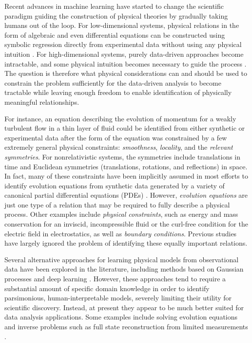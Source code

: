 \documentclass[
 reprint,
 amsmath,amssymb,
 aps,
]{revtex4-2}
\begin{document}
Recent advances in machine learning have started to change the scientific paradigm guiding the construction of physical theories by gradually taking humans out of the loop. For low-dimensional systems, physical relations in the form of algebraic and even differential equations can be constructed using symbolic regression directly from experimental data without using any physical intuition \cite{crutchfield1987,bongard2007,schmidt2009}. For high-dimensional systems, purely data-driven approaches become intractable, and some physical intuition becomes necessary to guide the process \cite{karpatne2017}. The question is therefore what physical considerations can and should be used to constrain the problem sufficiently for the data-driven analysis to become tractable while leaving enough freedom to enable identification of physically meaningful relationships.

For instance, an equation describing the evolution of momentum for a weakly turbulent flow in a thin layer of fluid could be identified from either synthetic  \cite{reinbold2020} or experimental data \cite{reinbold2021} after the form of the equation was constrained by a few extremely general physical constraints: {\it smoothness}, {\it locality}, and the {\it relevant symmetries}. 
For nonrelativistic systems, the symmetries include translations in time and Euclidean symmetries (translations, rotations, and reflections) in space. In fact, many of these constraints have been implicitly assumed in most efforts to identify evolution equations from synthetic data generated by a variety of canonical partial differential equations (PDEs) \cite{bar1999,xu2008,rudy2017,schaeffer2017,raissi2018}. However, {\it evolution equations} are just one type of a relation that may be required to fully describe a physical process. Other examples include {\it physical constraints}, such as energy and mass conservation for an inviscid, incompressible fluid or the curl-free condition for the electric field in electrostatics, as well as {\it boundary conditions}. Previous studies have largely ignored the problem of identifying these equally important relations.

Several alternative approaches for learning physical models from observational data have been explored in the literature, including methods based on Gaussian processes \cite{raissi2018} and deep learning  \cite{raissi2019}. However, these approaches tend to require a substantial amount of specific domain knowledge in order to identify parsimonious, human-interpretable models, severely limiting their utility for scientific discovery. Instead, at present they appear to be much better suited for data analysis applications. Some examples include solving evolution equations \cite{portwood2019} and inverse problems such as full state reconstruction from limited measurements \cite{raissi2020}.
\end{document}

